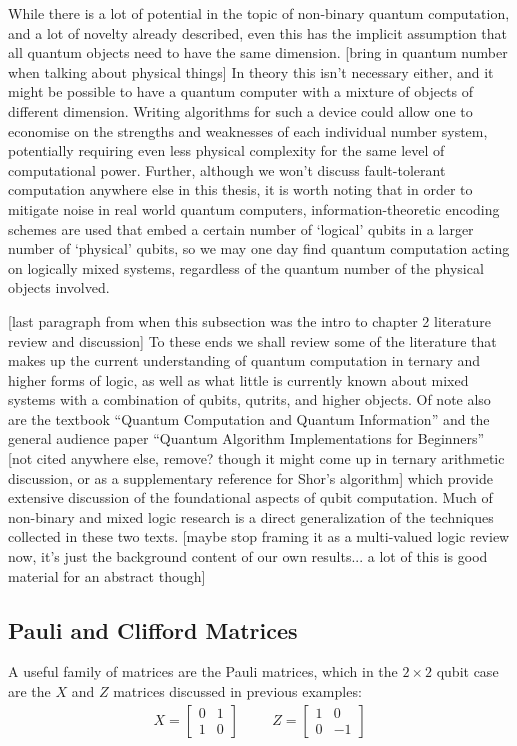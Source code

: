 While there is a lot of potential in the topic of non-binary quantum computation, and a lot of novelty already described, even this has the implicit assumption that all quantum objects need to have the same dimension. [bring in quantum number when talking about physical things] In theory this isn't necessary either, and it might be possible to have a quantum computer with a mixture of objects of different dimension. Writing algorithms for such a device could allow one to economise on the strengths and weaknesses of each individual number system, potentially requiring even less physical complexity for the same level of computational power. Further, although we won't discuss fault-tolerant computation anywhere else in this thesis, it is worth noting that in order to mitigate noise in real world quantum computers, information-theoretic encoding schemes are used that embed a certain number of `logical' qubits in a larger number of `physical' qubits, so we may one day find quantum computation acting on logically mixed systems, regardless of the quantum number of the physical objects involved.

[last paragraph from when this subsection was the intro to chapter 2 literature review and discussion]
To these ends we shall review some of the literature that makes up the current understanding of quantum computation in ternary and higher forms of logic, as well as what little is currently known about mixed systems with a combination of qubits, qutrits, and higher objects. Of note also are the textbook ``Quantum Computation and Quantum Information''\cite{textbook} and the general audience paper ``Quantum Algorithm Implementations for Beginners''\cite{algos} [not cited anywhere else, remove? though it might come up in ternary arithmetic discussion, or as a supplementary reference for Shor's algorithm] which provide extensive discussion of the foundational aspects of qubit computation. Much of non-binary and mixed logic research is a direct generalization of the techniques collected in these two texts. [maybe stop framing it as a multi-valued logic review now, it's just the background content of our own results... a lot of this is good material for an abstract though]

\subsection{Pauli and Clifford Matrices}
A useful family of matrices are the Pauli matrices, which in the $2\times2$ qubit case are the $X$ and $Z$ matrices discussed in previous examples:
\begin{align*}
X = \left[\begin{matrix}
0&1\\
1&0
\end{matrix}\right]
&&&
Z = \left[\begin{matrix}
1&0\\
0&-1
\end{matrix}\right]
\end{align*}

